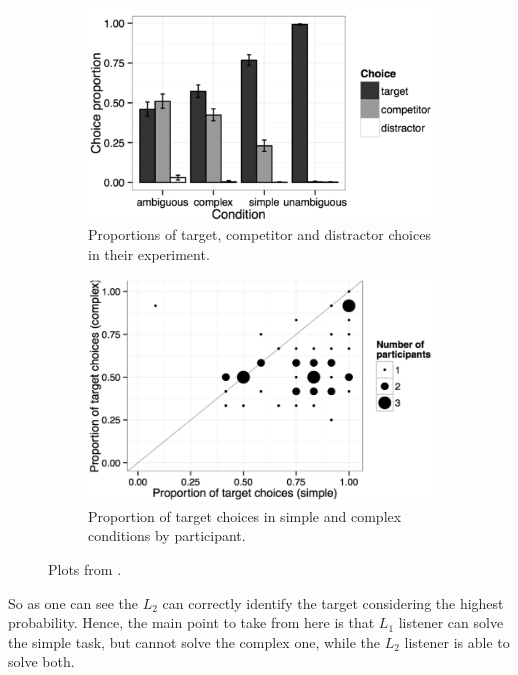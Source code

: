 \documentclass[11pt,a4paper]{article}
\begin{document}
\begin{figure}
\centering
\begin{subfigure}{.5\textwidth}
  \centering
  \includegraphics[width=1\linewidth]{images/trials_stats.png}
  \caption{Proportions of target, competitor and distractor choices in their experiment. }
  \label{fig:trial_stats}
\end{subfigure}%
\begin{subfigure}{.5\textwidth}
  \centering
  \includegraphics[width=1\linewidth]{images/l1_l2_stats.png}
  \caption{Proportion of target choices in simple and complex conditions by participant. }
  \label{fig:prob_stats}
\end{subfigure}
\caption{Plots from \cite{Franke_2016}.}
\label{fig:stats}
\end{figure}

So as one can see the $L_2$ can correctly identify the target considering the highest probability. Hence, the main point to take from here is that $L_1$ listener can solve the simple task, but cannot solve the complex one, while the $L_2$ listener is able to solve both. 
\end{document}
